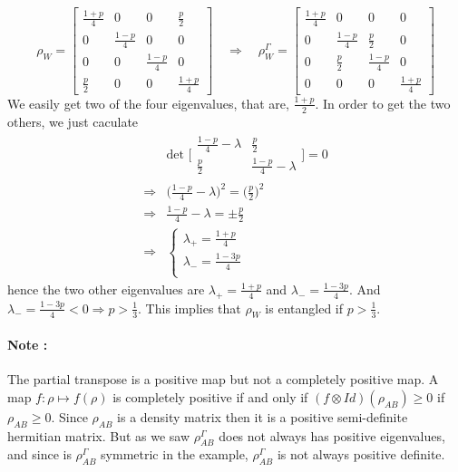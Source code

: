 \documentclass{article}
\begin{document}
\begin{equation}
    \rho_W =
    \begin{bmatrix}
        \frac{1+p}{4} & 0 & 0 & \frac{p}{2} \\
        0 & \frac{1-p}{4} & 0 & 0 \\
        0 & 0 & \frac{1-p}{4} & 0 \\
        \frac{p}{2} & 0 & 0 & \frac{1+p}{4}
    \end{bmatrix}
    \quad
    \Rightarrow
    \quad
    \rho_W^\Gamma =
    \begin{bmatrix}
        \frac{1+p}{4} & 0 & 0 & 0 \\
        0 & \frac{1-p}{4} & \frac{p}{2} & 0 \\
        0 & \frac{p}{2} & \frac{1-p}{4} & 0 \\
        0 & 0 & 0 & \frac{1+p}{4}
    \end{bmatrix}
\end{equation}
We easily get two of the four eigenvalues, that are, $\frac{1+p}{2}$.
In order to get the two others, we just caculate
\begin{equation}
    \begin{aligned}
        &\text{det }\Big[\begin{smallmatrix}
            \frac{1-p}{4} - \lambda & \frac{p}{2} \\
            \frac{p}{2} & \frac{1-p}{4} - \lambda
        \end{smallmatrix}\Big]
             = 0\\
        \Rightarrow
            & \big(\frac{1-p}{4}-\lambda\big)^2
            = \Big(\frac{p}{2}\Big)^2\\
        \Rightarrow
            & \frac{1-p}{4}-\lambda = \pm \frac{p}{2} \\
        \Rightarrow
            & \begin{cases}
                \lambda_+ = \frac{1+p}{4}\\
                \lambda_- = \frac{1-3p}{4} \\
            \end{cases}
    \end{aligned}
\end{equation}
hence the two other eigenvalues are $ \lambda_+ = \frac{1+p}{4}$ and $\lambda_-
= \frac{1-3p}{4} $. And $\lambda_- = \frac{1-3p}{4} < 0 \Rightarrow p >
\frac{1}{3}$.
This implies that $\rho_W$ is entangled if $p>\frac{1}{3}$.

\paragraph{Note :} The partial transpose is a positive map but not a completely
positive map. A map $f: \rho \mapsto f(\rho)$ is completely positive if and only if
$(f \otimes Id)(\rho_{AB}) \geq 0$ if $\rho_{AB} \geq 0$. Since $\rho_{AB}$ is
a density matrix then it is a positive semi-definite hermitian matrix.
But as we saw $\rho_{AB}^\Gamma$ does not always has positive eigenvalues, and
since is $\rho_{AB}^\Gamma$ symmetric in the example, $\rho_{AB}^\Gamma$ is not
always positive definite.
\end{document}
